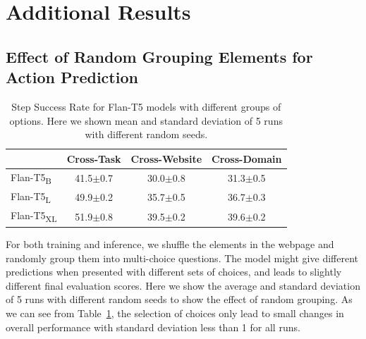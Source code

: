 \section{Additional Results}
\label{app:add_result}
\subsection{Effect of Random Grouping Elements for Action Prediction}
\label{app:random_group}
\begin{table}[]
    \centering
    \caption{Step Success Rate for Flan-T5 models with different groups of options. Here we shown mean and standard deviation of 5 runs with different random seeds.}
    \begin{tabular}{lccc}
    \toprule
         & \textbf{Cross-Task}& \textbf{Cross-Website} & \textbf{Cross-Domain} \\
         \midrule
      Flan-T5\textsubscript{B}   &  \num{41.5}$\pm$\num{0.7}&\num{30.0}$\pm$\num{0.8}&\num{31.3}$\pm$\num{0.5}\\
      Flan-T5\textsubscript{L}   &  \num{49.9}$\pm$\num{0.2}&\num{35.7}$\pm$\num{0.5}&\num{36.7}$\pm$\num{0.3}\\
      Flan-T5\textsubscript{XL}   &  \num{51.9}$\pm$\num{0.8}&\num{39.5}$\pm$\num{0.2}&\num{39.6}$\pm$\num{0.2}\\
      \bottomrule
    \end{tabular}
    \label{tab:random_runs}
\end{table}
For both training and inference, we shuffle the elements in the webpage and randomly group them into multi-choice questions. The model might give different predictions when presented with different sets of choices, and leads to slightly different final evaluation scores. Here we show the average and standard deviation of \num{5} runs with different random seeds to show the effect of random grouping. As we can see from Table~\ref{tab:random_runs}, the selection of choices only lead to small changes in overall performance with standard deviation less than 1 for all runs.
